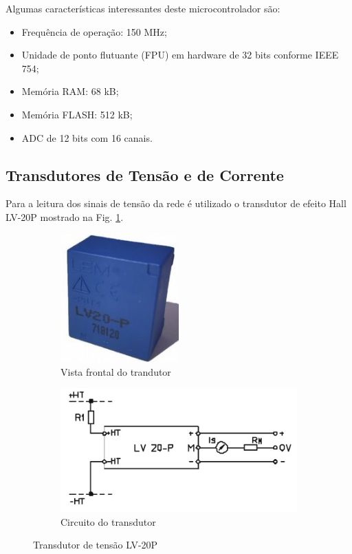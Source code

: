Algumas características interessantes deste microcontrolador são:
\begin{itemize}
    \item Frequência de operação: 150 MHz;
    \item Unidade de ponto flutuante (FPU) em hardware de 32 bits conforme IEEE 754;
    \item Memória RAM: 68 kB;
    \item Memória FLASH: 512 kB;
    \item ADC de 12 bits com 16 canais.
\end{itemize}

\subsection{Transdutores de Tensão e de Corrente}

Para a leitura dos sinais de tensão da rede é utilizado o transdutor de efeito Hall LV-20P mostrado na Fig. \ref{fig:transdutor_tensao}. 

\begin{figure}[!hbt]
	\centering
	\begin{subfigure}[b]{0.4\textwidth}
		\centering
		\includegraphics[width=0.5\textwidth]{figuras/Transdutor_Tensao.jpg}
		\caption{Vista frontal do trandutor}
	\end{subfigure}
	\begin{subfigure}[b]{0.4\textwidth}
		\includegraphics[width=\textwidth]{figuras/Transdutor_Tensao_Circuito.jpg}
		\caption{Circuito do transdutor}
	\end{subfigure}
	\caption{Transdutor de tensão LV-20P}\label{fig:transdutor_tensao}
\end{figure}

